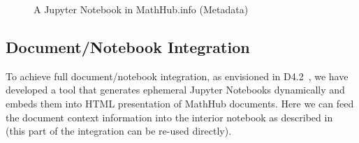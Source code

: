 \begin{figure}[ht]\centering
  \caption{A Jupyter Notebook in MathHub.info (Metadata)}\label{fig:mathhub-NB}
\end{figure}


\subsection{Document/Notebook Integration}

To achieve full document/notebook integration, as envisioned in D4.2~\cite{ODK-D4.2}, we have developed a tool that generates ephemeral Jupyter Notebooks dynamically and embeds them into HTML presentation of MathHub documents.
Here we can feed the document context information into the interior notebook as described in~\cite{ODK-D4.9} (this part of the integration can be re-used directly).

